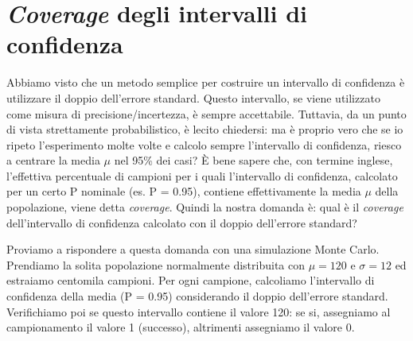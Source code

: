 \documentclass[a4paper,12pt,oneside]{book}
\begin{document}
\hypertarget{coverage-degli-intervalli-di-confidenza}{%
\section{\texorpdfstring{\emph{Coverage} degli intervalli di confidenza}{Coverage degli intervalli di confidenza}}\label{coverage-degli-intervalli-di-confidenza}}

Abbiamo visto che un metodo semplice per costruire un intervallo di confidenza è utilizzare il doppio dell'errore standard. Questo intervallo, se viene utilizzato come misura di precisione/incertezza, è sempre accettabile. Tuttavia, da un punto di vista strettamente probabilistico, è lecito chiedersi: ma è proprio vero che se io ripeto l'esperimento molte volte e calcolo sempre l'intervallo di confidenza, riesco a centrare la media \(\mu\) nel 95\% dei casi? È bene sapere che, con termine inglese, l'effettiva percentuale di campioni per i quali l'intervallo di confidenza, calcolato per un certo P nominale (es. P = 0.95), contiene effettivamente la media \(\mu\) della popolazione, viene detta \emph{coverage}. Quindi la nostra domanda è: qual è il \emph{coverage} dell'intervallo di confidenza calcolato con il doppio dell'errore standard?

Proviamo a rispondere a questa domanda con una simulazione Monte Carlo. Prendiamo la solita popolazione normalmente distribuita con \(\mu = 120\) e \(\sigma = 12\) ed estraiamo centomila campioni. Per ogni campione, calcoliamo l'intervallo di confidenza della media (P = 0.95) considerando il doppio dell'errore standard. Verifichiamo poi se questo intervallo contiene il valore 120: se si, assegniamo al campionamento il valore 1 (successo), altrimenti assegniamo il valore 0.
\end{document}
